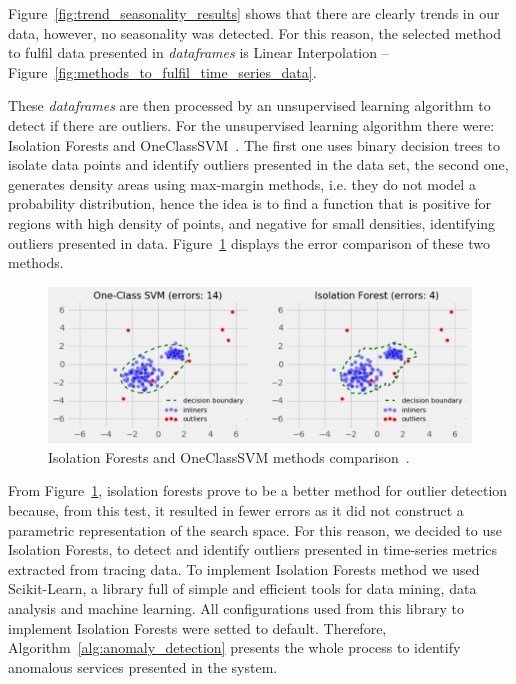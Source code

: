 Figure~\ref{fig:trend_seasonality_results} shows that there are clearly trends in our data, however, no seasonality was detected. For this reason, the selected method to fulfil data presented in \emph{dataframes} is Linear Interpolation -- Figure~\ref{fig:methods_to_fulfil_time_series_data}.

These \emph{dataframes} are then processed by an unsupervised learning algorithm to detect if there are outliers. For the unsupervised learning algorithm there were: Isolation Forests and OneClassSVM~\cite{Zhou2017}. The first one uses binary decision trees to isolate data points and identify outliers presented in the data set, the second one, generates density areas using max-margin methods, i.e. they do not model a probability distribution, hence the idea is to find a function that is positive for regions with high density of points, and negative for small densities, identifying outliers presented in data. Figure~\ref{fig:isolation_forests_and_oneclasssvm_comparison} displays the error comparison of these two methods.

\newpage

\begin{figure}[H]
    \centering\includegraphics[width=0.8\linewidth]{images/isolation_forests_and_oneclasssvm_comparison.pdf}
    \caption{Isolation Forests and OneClassSVM methods comparison~\cite{isolation_forests_and_oneclasssvm_comparison}.}
    \label{fig:isolation_forests_and_oneclasssvm_comparison}
\end{figure}

From Figure~\ref{fig:isolation_forests_and_oneclasssvm_comparison}, isolation forests prove to be a better method for outlier detection because, from this test, it resulted in fewer errors as it did not construct a parametric representation of the search space. For this reason, we decided to use Isolation Forests, to detect and identify outliers presented in time-series metrics extracted from tracing data. To implement Isolation Forests method we used Scikit-Learn, a library full of simple and efficient tools for data mining, data analysis and machine learning. All configurations used from this library to implement Isolation Forests were setted to default. Therefore, Algorithm~\ref{alg:anomaly_detection} presents the whole process to identify anomalous services presented in the system.

